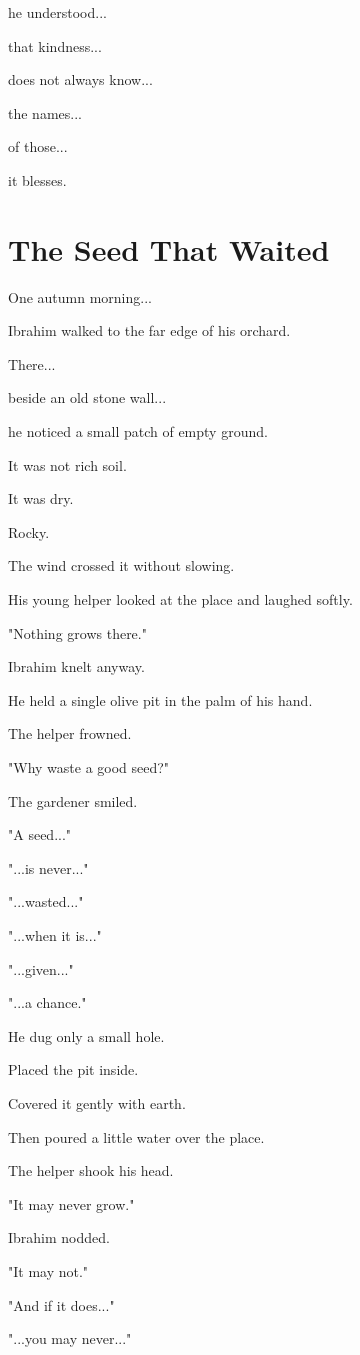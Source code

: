 \documentclass[12pt,openany]{book}
\begin{document}
he understood...

that kindness...

does not always know...

the names...

of those...

it blesses.
\section*{The Seed That Waited}

One autumn morning...

Ibrahim walked to the far edge of his orchard.

There...

beside an old stone wall...

he noticed a small patch of empty ground.

It was not rich soil.

It was dry.

Rocky.

The wind crossed it without slowing.

His young helper looked at the place and laughed softly.

"Nothing grows there."

Ibrahim knelt anyway.

He held a single olive pit in the palm of his hand.

The helper frowned.

"Why waste a good seed?"

The gardener smiled.

"A seed..."

"...is never..."

"...wasted..."

"...when it is..."

"...given..."

"...a chance."

He dug only a small hole.

Placed the pit inside.

Covered it gently with earth.

Then poured a little water over the place.

The helper shook his head.

"It may never grow."

Ibrahim nodded.

"It may not."

"And if it does..."

"...you may never..."
\end{document}
